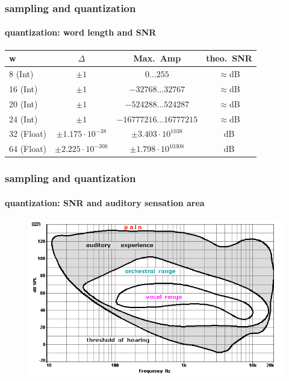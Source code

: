 	\begin{frame}\frametitle{sampling and quantization}\framesubtitle{quantization: word length and SNR}
			\begin{table}
			\centering
				\begin{footnotesize}
					\begin{tabular}{lccc}
					\hline
						\textbf{w} & \textbf{$\Delta$} & \textbf{Max.\ Amp} & \textbf{theo.\ SNR} \\
					\hline
						8 (Int)	&	$\pm1$ & $0\ldots255$ & $\approx$\unit[48]{dB}\\
						16 (Int)	&	$\pm1$ & $-32768\ldots32767$ & $\approx$\unit[96]{dB}\\
						20 (Int)	&	$\pm1$ & $-524288\ldots524287$ & $\approx$\unit[120]{dB}\\
						24 (Int)	&	$\pm1$ & $-16777216\ldots16777215$ & $\approx$\unit[144]{dB}\\
					\hline
						32 (Float)	&	$\pm1.175\cdot10^{-38}$ & $\pm3.403\cdot10^{1038}$ & \unit[1529]{dB}\\
						64 (Float)	&	$\pm2.225\cdot10^{-308}$ & $\pm1.798\cdot10^{10308}$ & \unit[12318]{dB}\\
					\hline
					\end{tabular}  
				\end{footnotesize}
			\end{table}
	\end{frame}	
	
	\begin{frame}\frametitle{sampling and quantization}\framesubtitle{quantization: SNR and auditory sensation area}
	    \begin{figure}
			\centering
				\includegraphics[scale=0.5]{Graph/hoerfeld}
		\end{figure}
	\end{frame}

